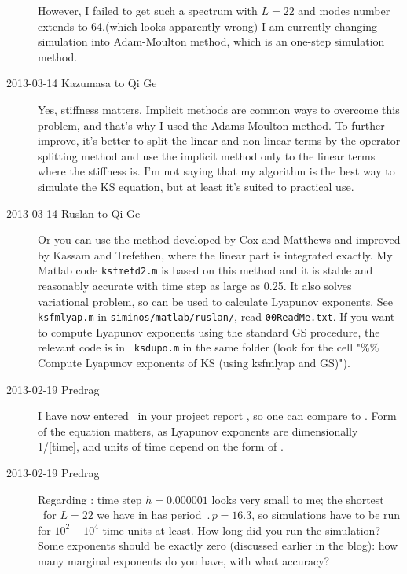 \begin{description}
However, I failed to get such a spectrum with \(L = 22\) and modes
number extends to 64.(which looks apparently wrong) I am currently
changing simulation into
{Adam-Moulton} method, which is an one-step
simulation method.

\item[2013-03-14 Kazumasa to Qi Ge]
Yes, stiffness matters.
Implicit methods are common ways to overcome this problem,
 and that's why I used the Adams-Moulton method.
To further improve, it's better to split the linear and non-linear terms
 by the operator splitting method
 and use the implicit method only to the linear terms where the stiffness is.
I'm not saying that my algorithm is the best way to simulate the KS equation,
 but at least it's suited to practical use.

\item[2013-03-14 Ruslan to Qi Ge]
Or you can use the method developed by Cox and
Matthews and improved by Kassam and
Trefethen, where the linear part is integrated exactly.
My Matlab code {\tt ksfmetd2.m} is based on this method and it is
stable and reasonably accurate with time step as large as 0.25.  It
also solves variational problem, so can be used to calculate Lyapunov
exponents.  See {\tt ksfmlyap.m} in {\tt siminos/matlab/ruslan/},
read {\tt 00ReadMe.txt}.  If you want to compute Lyapunov exponents
using the standard GS procedure, the relevant code is in {\tt
ksdupo.m} in the same folder (look for the cell "\%\% Compute
Lyapunov exponents of KS (using ksfmlyap and GS)").

\item[2013-02-19 Predrag]
I have now entered \KSe\ in your project report
, so one can compare to . Form of
the equation matters, as Lyapunov exponents are dimensionally
1/[time], and units of time depend on the form of \KSe.



\item[2013-02-19 Predrag]
Regarding : time step $h = 0.000001$ looks
very small to me; the shortest \po\ for $L = 22$ we have in
 has period $\period{p} = 16.3$, so simulations have to
be run for $10^2-10^4$ time units at least.
How long did you run the simulation?
Some exponents should be exactly zero (discussed earlier in the
blog): how many marginal exponents do you have, with what accuracy?


\end{description}
